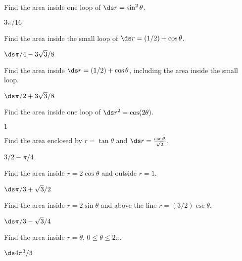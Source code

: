 \begin{exercises}
\begin{exercise} Find the area inside one loop of $\ds r=\sin^2\theta$.
\begin{answer} $3\pi/16$
\end{answer}\end{exercise}

\begin{exercise} Find the area inside the small loop of $\ds r=(1/2)+\cos\theta$.
\begin{answer} $\ds \pi/4-3\sqrt3/8$
\end{answer}\end{exercise}

\begin{exercise} Find the area inside $\ds r=(1/2)+\cos\theta$, including the
area inside the small loop.
\begin{answer} $\ds \pi/2+3\sqrt3/8$
\end{answer}\end{exercise}

\begin{exercise} Find the area inside one loop of $\ds r^2=\cos(2\theta)$.
\begin{answer} $1$
\end{answer}\end{exercise}

\begin{exercise} Find the area enclosed by $r=\tan\theta$ and 
$\ds r={\csc\theta\over\sqrt2}$.
\begin{answer} $3/2-\pi/4$
\end{answer}\end{exercise}

\begin{exercise} Find the area inside $r=2\cos\theta$ and outside
$r=1$.
\begin{answer} $\ds \pi/3+\sqrt3/2$
\end{answer}\end{exercise}

\begin{exercise} Find the area inside $r=2\sin\theta$ and above
the line $r=(3/2)\csc\theta$.
\begin{answer} $\ds \pi/3-\sqrt3/4$
\end{answer}\end{exercise}

\begin{exercise} Find the area inside $r=\theta$, $0\le\theta\le2\pi$.
\begin{answer} $\ds 4\pi^3/3$
\end{answer}\end{exercise}


\end{exercises}
